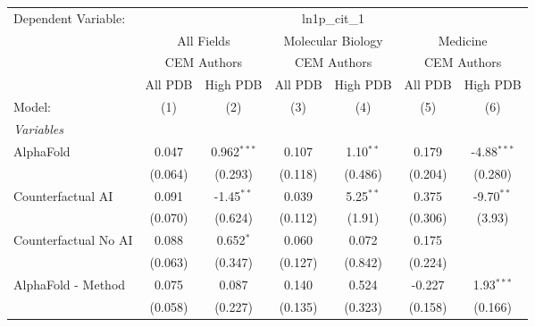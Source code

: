 \begingroup
\centering
\begin{tabular}{lcccccc}
   \tabularnewline \midrule \midrule
   Dependent Variable: & \multicolumn{6}{c}{ln1p\_cit\_1}\\
 & \multicolumn{2}{c}{All Fields} & \multicolumn{2}{c}{Molecular Biology} & \multicolumn{2}{c}{Medicine} \\
\cmidrule(lr){2-3} \cmidrule(lr){4-5} \cmidrule(lr){6-7}
 & \multicolumn{2}{c}{CEM Authors} & \multicolumn{2}{c}{CEM Authors} & \multicolumn{2}{c}{CEM Authors} \\
\cmidrule(lr){2-3} \cmidrule(lr){4-5} \cmidrule(lr){6-7}
 & \multicolumn{1}{c}{All PDB} & \multicolumn{1}{c}{High PDB} & \multicolumn{1}{c}{All PDB} & \multicolumn{1}{c}{High PDB} & \multicolumn{1}{c}{All PDB} & \multicolumn{1}{c}{High PDB} \\
\cmidrule(lr){2-2} \cmidrule(lr){3-3} \cmidrule(lr){4-4} \cmidrule(lr){5-5} \cmidrule(lr){6-6} \cmidrule(lr){7-7}
   Model:                                                     & (1)          & (2)           & (3)          & (4)          & (5)     & (6)\\  
   \midrule
   \emph{Variables}\\
   AlphaFold                                                  & 0.047        & 0.962$^{***}$ & 0.107        & 1.10$^{**}$  & 0.179   & -4.88$^{***}$\\   
                                                              & (0.064)      & (0.293)       & (0.118)      & (0.486)      & (0.204) & (0.280)\\   
   Counterfactual AI                                          & 0.091        & -1.45$^{**}$  & 0.039        & 5.25$^{**}$  & 0.375   & -9.70$^{**}$\\   
                                                              & (0.070)      & (0.624)       & (0.112)      & (1.91)       & (0.306) & (3.93)\\   
   Counterfactual No AI                                       & 0.088        & 0.652$^{*}$   & 0.060        & 0.072        & 0.175   &   \\   
                                                              & (0.063)      & (0.347)       & (0.127)      & (0.842)      & (0.224) &   \\   
   AlphaFold - Method                                         & 0.075        & 0.087         & 0.140        & 0.524        & -0.227  & 1.93$^{***}$\\   
                                                              & (0.058)      & (0.227)       & (0.135)      & (0.323)      & (0.158) & (0.166)\\   

\end{tabular}
